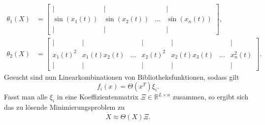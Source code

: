 \begin{align}
\theta_1(X) &= \begin{bmatrix}
		\mid 	  & \mid     		  &          & \mid             \\
		\sin(x_1(t)) & \sin(x_2(t))   & \dots    & \sin(x_n(t)) \\
		\mid      & \mid     		  &          & \mid              
	\end{bmatrix},\\
\theta_2(X) &= \begin{bmatrix}
		\mid & \mid & & \mid & \mid & & \mid \\
		x_1(t)^2 & x_1(t)x_2(t) & \dots & x_2(t)^2 & x_2(t)x_3(t) & \dots & x_n^2(t) \\
		\mid & \mid & & \mid & \mid & & \mid
	\end{bmatrix}.
\end{align}
Gesucht sind nun Linearkombinationen von Bibliotheksfunktionen, sodass gilt
\begin{equation}
f_i(x) = \Theta(x^T)\xi_i.
\end{equation}
Fasst man alle $\xi_i$ in eine Koeffizientenmatrix $\Xi\in\mathbb{R}^{L\times n}$ zusammen, so ergibt sich das zu lösende Minimierungsproblem zu 
\begin{equation}
\dot{X} \approx \Theta(X)\Xi. \label{eq:Minimierungsproblem}
\end{equation}


